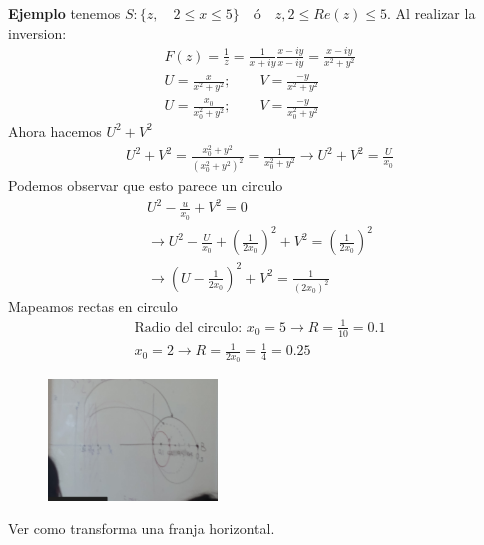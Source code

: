 \documentclass{article}
\newcommand{\caja}[3]{%
  \begin{tcolorbox}[colback=#1!5!white,colframe=#1!25!black,title=#2]
    #3
  \end{tcolorbox}%
}
\begin{document}
\textbf{Ejemplo } tenemos $ S: \{ z, \quad 2\leq x\leq 5 \} \quad \text{ó} \quad {z, 2\leq Re\left(z \right)\leq 5} $. Al realizar la inversion: 
\begin{gather}
  F\left(z\right)=\frac{1}{z} = \frac{1}{x+iy }\frac{x-iy }{x-iy } = \frac{x-iy }{x ^2 + y ^2}\\
  U = \frac{x }{x ^2 + y ^2}; \qquad V = \frac{-y }{x ^2 + y ^2}\\
  U = \frac{x_0 }{x_0 ^2 + y ^2 }; \qquad V = \frac{-y }{x_0 ^2+y ^2}
\end{gather}
Ahora hacemos $ U ^2+ V ^2 $
\begin{gather}
   U ^2 + V^2 = \frac{x_0 ^2 + y ^2 }{(x_0 ^2+ y ^2)^2} = \frac{1}{x_0 ^2+ y ^2} \rightarrow U ^2 + V ^2 = \frac{U }{x_0 }
\end{gather}
Podemos observar que esto parece un circulo
\begin{gather}
  U ^2 - \frac{u }{x_0 }+ V ^2 = 0 \\
  \rightarrow U ^2 - \frac{U}{x_0 } + \left(\frac{1}{2x_0 }\right)^2 + V ^2 = \left(\frac{1}{2x_0 }\right) ^2\\
  \rightarrow \left(U- \frac{1}{2x_0 }\right) ^2 + V ^2 = \frac{1}{(2x_0 )^2}
\end{gather}
Mapeamos rectas en circulo
\begin{gather}
  \text{Radio del circulo: } x_0 = 5 \rightarrow R = \frac{1}{10 } = 0.1\\
  x_0=2 \rightarrow R = \frac{1}{2x_0 } = \frac{1}{4} = 0.25
\end{gather}
\begin{figure}[H]
  \begin{center}
    \includegraphics[width=0.4\textwidth]{inversion_rectas.png}
  \end{center}
\end{figure}

\caja{blue}{Tarea}{
  Ver como transforma una franja horizontal.
}
\end{document}
